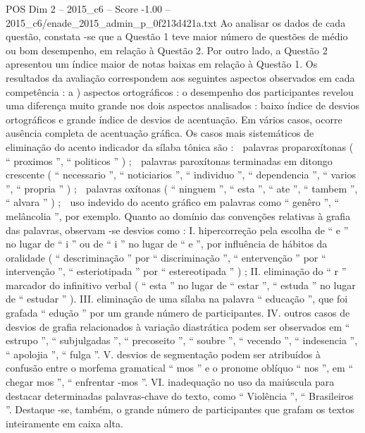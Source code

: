 \begin{textsample}{POS Dim 2 – 2015\_c6 – Score -1.00 – 2015\_c6/enade\_2015\_admin\_p\_0f213d421a.txt}
Ao analisar os dados de cada questão, constata -se que a Questão 1 teve maior número de questões de médio ou bom desempenho, em relação à Questão 2.
Por outro lado, a Questão 2 apresentou um índice maior de notas baixas em relação à Questão 1.
Os resultados da avaliação correspondem aos seguintes aspectos observados em cada competência : a ) aspectos ortográficos : o desempenho dos participantes revelou uma diferença muito grande nos dois aspectos analisados : baixo índice de desvios ortográficos e grande índice de desvios de acentuação.
Em vários casos, ocorre ausência completa de acentuação gráfica.
Os casos mais sistemáticos de eliminação do acento indicador da sílaba tônica são :  palavras proparoxítonas ( “ proximos ”, “ politicos ” ) ;  palavras paroxítonas terminadas em ditongo crescente ( “ necessario ”, “ noticiarios ”, “ individuo ”, “ dependencia ”, “ varios ”, “ propria ” ) ;  palavras oxítonas ( “ ninguem ”, “ esta ”, “ ate ”, “ tambem ”, “ alvara ” ) ;  uso indevido do acento gráfico em palavras como “ genêro ”, “ melâncolia ”, por exemplo.
Quanto ao domínio das convenções relativas à grafia das palavras, observam -se desvios como : I. hipercorreção pela escolha de “ e ” no lugar de “ i ” ou de “ i ” no lugar de “ e ”, por influência de hábitos da oralidade ( “ descriminação ” por “ discriminação ”, “ entervenção ” por “ intervenção ”, “ esteriotipada ” por “ estereotipada ” ) ; II. eliminação do “ r ” marcador do infinitivo verbal ( “ esta ” no lugar de “ estar ”, “ estuda ” no lugar de “ estudar ” ).
III. eliminação de uma sílaba na palavra “ educação ”, que foi grafada “ edução ” por um grande número de participantes.
IV. outros casos de desvios de grafia relacionados à variação diastrática podem ser observados em “ estrupo ”, “ subjulgadas ”, “ precoseito ”, “ soubre ”, “ vecendo ”, “ indesencia ”, “ apolojia ”, “ fulga ”.
V. desvios de segmentação podem ser atribuídos à confusão entre o morfema gramatical “ mos ” e o pronome oblíquo “ nos ”, em “ chegar mos ”, “ enfrentar -mos ”.
VI. inadequação no uso da maiúscula para destacar determinadas palavras-chave do texto, como “ Violência ”, “ Brasileiros ”.
Destaque -se, também, o grande número de participantes que grafam os textos inteiramente em caixa alta.

\end{textsample}
